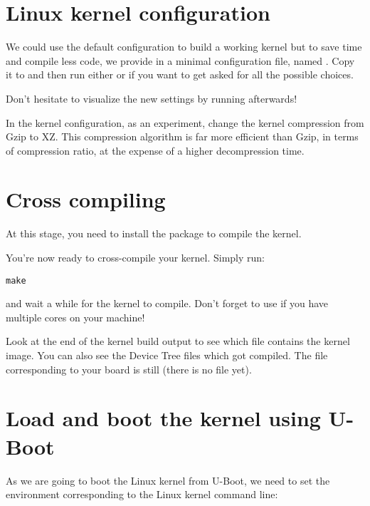 \section{Linux kernel configuration}

We could use the  default configuration to
build a working kernel but to save time and compile less code, we
provide in
 a minimal configuration
file, named . Copy it to  and
then run either  or  if
you want to get asked for all the possible choices.

Don't hesitate to visualize the new settings by running
 afterwards!

In the kernel configuration, as an experiment, change the kernel
compression from Gzip to XZ. This compression algorithm is far more
efficient than Gzip, in terms of compression ratio, at the expense of
a higher decompression time.

\section{Cross compiling}

At this stage, you need to install the 
package to compile the kernel.

You're now ready to cross-compile your kernel. Simply run:

\begin{verbatim}
make
\end{verbatim}

and wait a while for the kernel to compile. Don't forget to use
 if you have multiple cores on your machine!

Look at the end of the kernel build output to see which file contains
the kernel image. You can also see the Device Tree  files
which got compiled. The  file corresponding to your
board is still  (there is no
 file yet).

\section{Load and boot the kernel using U-Boot}

As we are going to boot the Linux kernel from U-Boot,
we need to set the  environment corresponding
to the Linux kernel command line:

